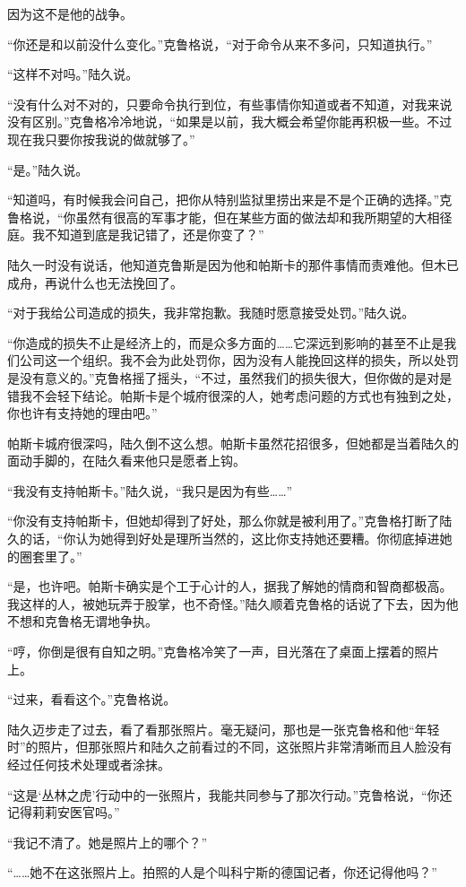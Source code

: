 因为这不是他的战争。

“你还是和以前没什么变化。”克鲁格说，“对于命令从来不多问，只知道执行。”

“这样不对吗。”陆久说。

“没有什么对不对的，只要命令执行到位，有些事情你知道或者不知道，对我来说没有区别。”克鲁格冷冷地说，“如果是以前，我大概会希望你能再积极一些。不过现在我只要你按我说的做就够了。”

“是。”陆久说。

“知道吗，有时候我会问自己，把你从特别监狱里捞出来是不是个正确的选择。”克鲁格说，“你虽然有很高的军事才能，但在某些方面的做法却和我所期望的大相径庭。我不知道到底是我记错了，还是你变了？”

陆久一时没有说话，他知道克鲁斯是因为他和帕斯卡的那件事情而责难他。但木已成舟，再说什么也无法挽回了。

“对于我给公司造成的损失，我非常抱歉。我随时愿意接受处罚。”陆久说。

“你造成的损失不止是经济上的，而是众多方面的……它深远到影响的甚至不止是我们公司这一个组织。我不会为此处罚你，因为没有人能挽回这样的损失，所以处罚是没有意义的。”克鲁格摇了摇头，“不过，虽然我们的损失很大，但你做的是对是错我不会轻下结论。帕斯卡是个城府很深的人，她考虑问题的方式也有独到之处，你也许有支持她的理由吧。”

帕斯卡城府很深吗，陆久倒不这么想。帕斯卡虽然花招很多，但她都是当着陆久的面动手脚的，在陆久看来他只是愿者上钩。

“我没有支持帕斯卡。”陆久说，“我只是因为有些……”

“你没有支持帕斯卡，但她却得到了好处，那么你就是被利用了。”克鲁格打断了陆久的话，“你认为她得到好处是理所当然的，这比你支持她还要糟。你彻底掉进她的圈套里了。”

“是，也许吧。帕斯卡确实是个工于心计的人，据我了解她的情商和智商都极高。我这样的人，被她玩弄于股掌，也不奇怪。”陆久顺着克鲁格的话说了下去，因为他不想和克鲁格无谓地争执。

“哼，你倒是很有自知之明。”克鲁格冷笑了一声，目光落在了桌面上摆着的照片上。

“过来，看看这个。”克鲁格说。

陆久迈步走了过去，看了看那张照片。毫无疑问，那也是一张克鲁格和他“年轻时”的照片，但那张照片和陆久之前看过的不同，这张照片非常清晰而且人脸没有经过任何技术处理或者涂抹。

“这是‘丛林之虎’行动中的一张照片，我能共同参与了那次行动。”克鲁格说，“你还记得莉莉安医官吗。”

“我记不清了。她是照片上的哪个？”

“……她不在这张照片上。拍照的人是个叫科宁斯的德国记者，你还记得他吗？”

